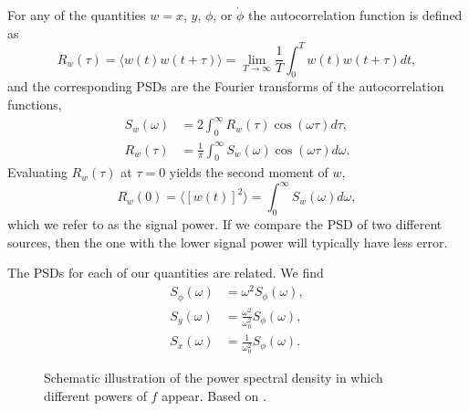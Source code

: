 For any of the quantities $w=x$, $y$, $\phi$, or $\dot{\phi}$ the autocorrelation function is defined as
%
\begin{equation}
\label{eq:autocorr}
R_w(\tau) = \langle w(t)w(t+\tau) \rangle = \lim\limits_{T\to\infty}\frac{1}{T}\int_{0}^{T} w(t)w(t+\tau)dt,
\end{equation}
%
and the corresponding PSDs are the Fourier transforms of the autocorrelation functions,
%
\begin{align}
S_w(\omega) &= 2\int_0^\infty R_w(\tau)\cos(\omega\tau)d\tau, \\
R_w(\tau) &= \frac{1}{\pi}\int_0^\infty S_w(\omega)\cos(\omega\tau)d\omega.
\end{align}
%
Evaluating $R_w(\tau)$ at $\tau = 0$ yields the second moment of $w$, 
%
\begin{equation}
R_w(0) = \langle [w(t)]^2 \rangle = \int_0^\infty S_w(\omega) d\omega,
\end{equation}
%
which we refer to as the signal power. If we compare the PSD of two different sources, then the one with the lower signal power will typically have less error.

The PSDs for each of our quantities are related. We find
%
\begin{subequations}
\begin{align}
S_{\dot{\phi}}(\omega) &= \omega^2 S_\phi(\omega), \\
S_y(\omega) &= \frac{\omega^2}{\omega_0^2}S_\phi(\omega), \\
S_x(\omega) &= \frac{1}{\omega_0^2}S_\phi(\omega).
\end{align}
\end{subequations}

\begin{figure}[htp]
	\raggedright
	\renewcommand{\baselinestretch}{1}
	\small\normalsize
	\caption{Schematic illustration of the power spectral density in which different powers of $f$ appear. Based on \cite{PSDFigure}. \label{fig:PSD}}
\end{figure}
\renewcommand{\baselinestretch}{2}
\small\normalsize

